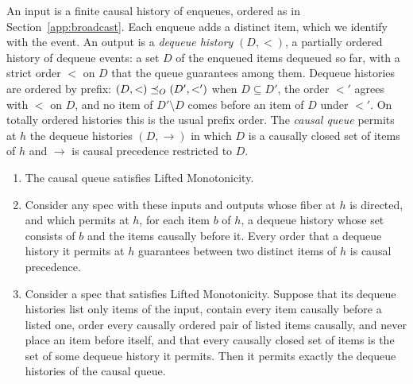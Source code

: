 An input is a finite causal history of enqueues, ordered as in
Section~\ref{app:broadcast}.  Each enqueue adds a distinct item, which we
identify with the event.  An output is a \emph{dequeue history} $(D,<)$, a
partially ordered history of dequeue events: a set $D$ of the enqueued items
dequeued so far, with a strict order $<$ on $D$ that the queue guarantees
among them.  Dequeue histories are ordered by prefix:
$(D,<)\preceq_O(D',<')$ when $D\subseteq D'$, the order $<'$ agrees with $<$
on $D$, and no item of $D'\setminus D$ comes before an item of $D$ under
$<'$.  On totally ordered histories this is the usual prefix order.  The
\emph{causal queue} permits at $h$ the dequeue histories $(D,\to)$ in which $D$
is a causally closed set of items of $h$ and $\to$ is causal precedence
restricted to $D$.

\begin{proposition}
\label{prop:causal-queue}
\leavevmode
\begin{enumerate}
  \item The causal queue satisfies Lifted Monotonicity.
  \item Consider any spec with these inputs and outputs whose fiber at $h$ is
        directed, and which permits at $h$, for each item $b$ of $h$, a
        dequeue history whose set consists of $b$ and the items causally
        before it.  Every order that a dequeue history it permits at $h$
        guarantees between two distinct items of $h$ is causal precedence.
  \item Consider a spec that satisfies Lifted Monotonicity.  Suppose that its
        dequeue histories list only items of the input, contain every item
        causally before a listed one, order every causally ordered pair of
        listed items causally, and never place an item before itself, and that
        every causally closed set of items is the set of some dequeue history
        it permits.  Then it permits exactly the dequeue histories of the
        causal queue.
\end{enumerate}
\end{proposition}

